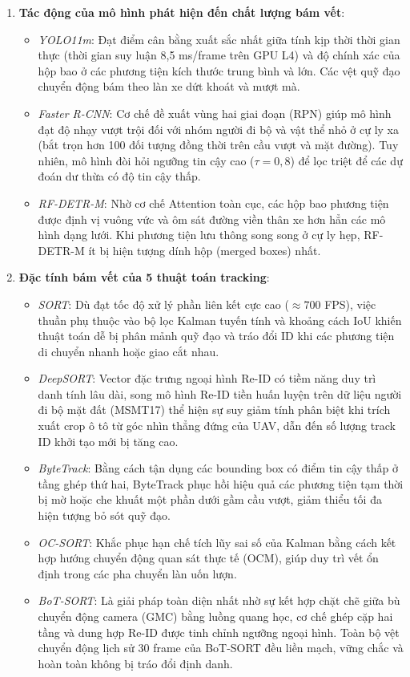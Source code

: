 \documentclass[fontsize=13pt,a4paper,oneside,parskip=false,numbers=noenddot,bibliography=totoc]{scrreprt}
\begin{document}
\begin{enumerate}
  \item \textbf{Tác động của mô hình phát hiện đến chất lượng bám vết}:
  \begin{itemize}
    \item \textit{YOLO11m}: Đạt điểm cân bằng xuất sắc nhất giữa tính kịp thời thời gian thực (thời gian suy luận 8,5 ms/frame trên GPU L4) và độ chính xác của hộp bao ở các phương tiện kích thước trung bình và lớn. Các vệt quỹ đạo chuyển động bám theo làn xe dứt khoát và mượt mà.
    \item \textit{Faster R-CNN}: Cơ chế đề xuất vùng hai giai đoạn (RPN) giúp mô hình đạt độ nhạy vượt trội đối với nhóm người đi bộ và vật thể nhỏ ở cự ly xa (bắt trọn hơn 100 đối tượng đồng thời trên cầu vượt và mặt đường). Tuy nhiên, mô hình đòi hỏi ngưỡng tin cậy cao ($\tau=0{,}8$) để lọc triệt để các dự đoán dư thừa có độ tin cậy thấp.
    \item \textit{RF-DETR-M}: Nhờ cơ chế Attention toàn cục, các hộp bao phương tiện được định vị vuông vức và ôm sát đường viền thân xe hơn hẳn các mô hình dạng lưới. Khi phương tiện lưu thông song song ở cự ly hẹp, RF-DETR-M ít bị hiện tượng dính hộp (merged boxes) nhất.
  \end{itemize}

  \item \textbf{Đặc tính bám vết của 5 thuật toán tracking}:
  \begin{itemize}
    \item \textit{SORT}: Dù đạt tốc độ xử lý phần liên kết cực cao ($\approx 700$ FPS), việc thuần phụ thuộc vào bộ lọc Kalman tuyến tính và khoảng cách IoU khiến thuật toán dễ bị phân mảnh quỹ đạo và tráo đổi ID khi các phương tiện di chuyển nhanh hoặc giao cắt nhau.
    \item \textit{DeepSORT}: Vector đặc trưng ngoại hình Re-ID có tiềm năng duy trì danh tính lâu dài, song mô hình Re-ID tiền huấn luyện trên dữ liệu người đi bộ mặt đất (MSMT17) thể hiện sự suy giảm tính phân biệt khi trích xuất crop ô tô từ góc nhìn thẳng đứng của UAV, dẫn đến số lượng track ID khởi tạo mới bị tăng cao.
    \item \textit{ByteTrack}: Bằng cách tận dụng các bounding box có điểm tin cậy thấp ở tầng ghép thứ hai, ByteTrack phục hồi hiệu quả các phương tiện tạm thời bị mờ hoặc che khuất một phần dưới gầm cầu vượt, giảm thiểu tối đa hiện tượng bỏ sót quỹ đạo.
    \item \textit{OC-SORT}: Khắc phục hạn chế tích lũy sai số của Kalman bằng cách kết hợp hướng chuyển động quan sát thực tế (OCM), giúp duy trì vết ổn định trong các pha chuyển làn uốn lượn.
    \item \textit{BoT-SORT}: Là giải pháp toàn diện nhất nhờ sự kết hợp chặt chẽ giữa bù chuyển động camera (GMC) bằng luồng quang học, cơ chế ghép cặp hai tầng và dung hợp Re-ID được tinh chỉnh ngưỡng ngoại hình. Toàn bộ vệt chuyển động lịch sử 30 frame của BoT-SORT đều liền mạch, vững chắc và hoàn toàn không bị tráo đổi định danh.
  \end{itemize}
\end{enumerate}
\end{document}
